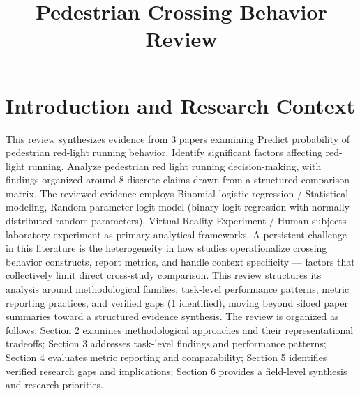 \documentclass{article}
\title{Pedestrian Crossing Behavior Review}
\begin{document}
\maketitle
\section{Introduction and Research Context}
This review synthesizes evidence from 3 papers examining Predict probability of pedestrian red-light running behavior, Identify significant factors affecting red-light running, Analyze pedestrian red light running decision-making, with findings organized around 8 discrete claims drawn from a structured comparison matrix. The reviewed evidence employs Binomial logistic regression / Statistical modeling, Random parameter logit model (binary logit regression with normally distributed random parameters), Virtual Reality Experiment / Human-subjects laboratory experiment as primary analytical frameworks. A persistent challenge in this literature is the heterogeneity in how studies operationalize crossing behavior constructs, report metrics, and handle context specificity — factors that collectively limit direct cross-study comparison. This review structures its analysis around methodological families, task-level performance patterns, metric reporting practices, and verified gaps (1 identified), moving beyond siloed paper summaries toward a structured evidence synthesis. The review is organized as follows: Section 2 examines methodological approaches and their representational tradeoffs; Section 3 addresses task-level findings and performance patterns; Section 4 evaluates metric reporting and comparability; Section 5 identifies verified research gaps and implications; Section 6 provides a field-level synthesis and research priorities.
\end{document}
